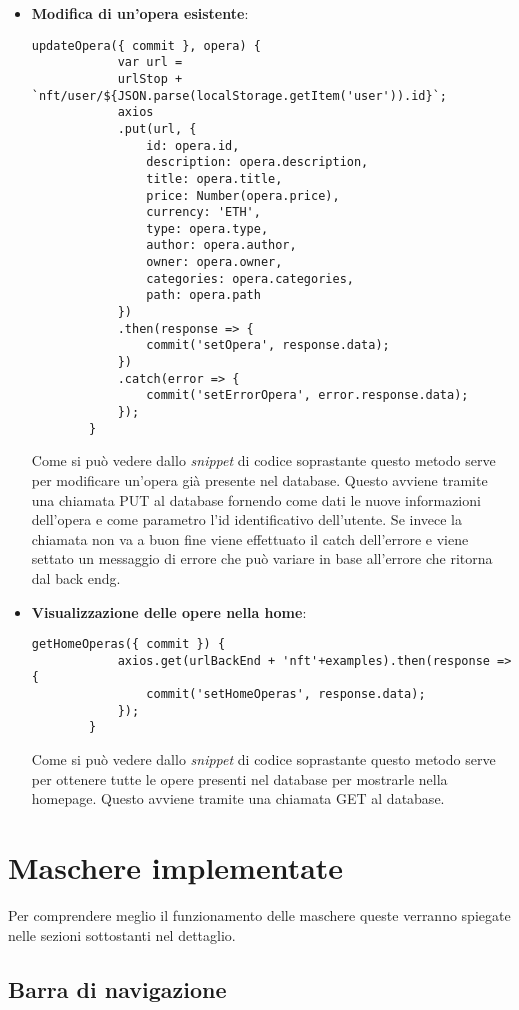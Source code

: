 \begin{itemize}
	\item \textbf{Modifica di un'opera esistente}:
	\begin{lstlisting}[caption=Modifica di un'opera esistente., label=lst::modOpera]
		updateOpera({ commit }, opera) {
			var url =
			urlStop + `nft/user/${JSON.parse(localStorage.getItem('user')).id}`;
			axios
			.put(url, {
				id: opera.id,
				description: opera.description,
				title: opera.title,
				price: Number(opera.price),
				currency: 'ETH',
				type: opera.type,
				author: opera.author,
				owner: opera.owner,
				categories: opera.categories,
				path: opera.path
			})
			.then(response => {
				commit('setOpera', response.data);
			})
			.catch(error => {
				commit('setErrorOpera', error.response.data);
			});
		}
	\end{lstlisting}
	Come si può vedere dallo \textit{snippet} di codice soprastante questo metodo serve per modificare un'opera già presente nel database. Questo avviene tramite una chiamata PUT al database fornendo come dati le nuove informazioni dell'opera e come parametro l'id identificativo dell'utente. Se invece  la chiamata non va a buon fine viene effettuato il catch dell'errore e viene settato un messaggio di errore che può variare in base all'errore che ritorna dal \gls{back endg}.
	\item \textbf{Visualizzazione delle opere nella home}:
	\begin{lstlisting}[caption=Visualizzazione delle opere nella home., label=lst::visOpereHome]
		getHomeOperas({ commit }) {
			axios.get(urlBackEnd + 'nft'+examples).then(response => {
				commit('setHomeOperas', response.data);
			});
		}
	\end{lstlisting}
	Come si può vedere dallo \textit{snippet} di codice soprastante questo metodo serve per ottenere tutte le opere presenti nel database per mostrarle nella homepage. Questo avviene tramite una chiamata GET al database.
\end{itemize}

\section{Maschere implementate}
\label{sec:maschere-implementate}

Per comprendere meglio il funzionamento delle maschere queste verranno spiegate nelle sezioni sottostanti nel dettaglio.

\subsection{Barra di navigazione}
\label{subsec:barra-navigazione}

